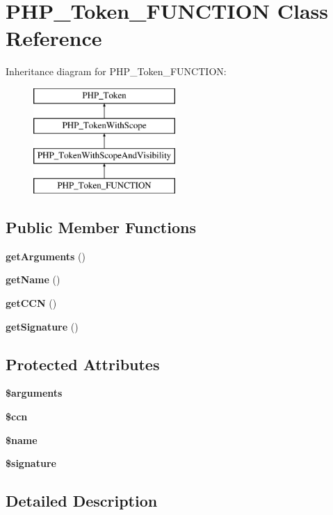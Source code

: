 \section{P\+H\+P\+\_\+\+Token\+\_\+\+F\+U\+N\+C\+T\+I\+O\+N Class Reference}
\label{class_p_h_p___token___f_u_n_c_t_i_o_n}
Inheritance diagram for P\+H\+P\+\_\+\+Token\+\_\+\+F\+U\+N\+C\+T\+I\+O\+N\+:\begin{figure}[H]
\begin{center}
\leavevmode
\includegraphics[height=4.000000cm]{class_p_h_p___token___f_u_n_c_t_i_o_n}
\end{center}
\end{figure}
\subsection*{Public Member Functions}
\begin{DoxyCompactItemize}
\item 
{\bf get\+Arguments} ()
\item 
{\bf get\+Name} ()
\item 
{\bf get\+C\+C\+N} ()
\item 
{\bf get\+Signature} ()
\end{DoxyCompactItemize}
\subsection*{Protected Attributes}
\begin{DoxyCompactItemize}
\item 
{\bf \$arguments}
\item 
{\bf \$ccn}
\item 
{\bf \$name}
\item 
{\bf \$signature}
\end{DoxyCompactItemize}


\subsection{Detailed Description}


